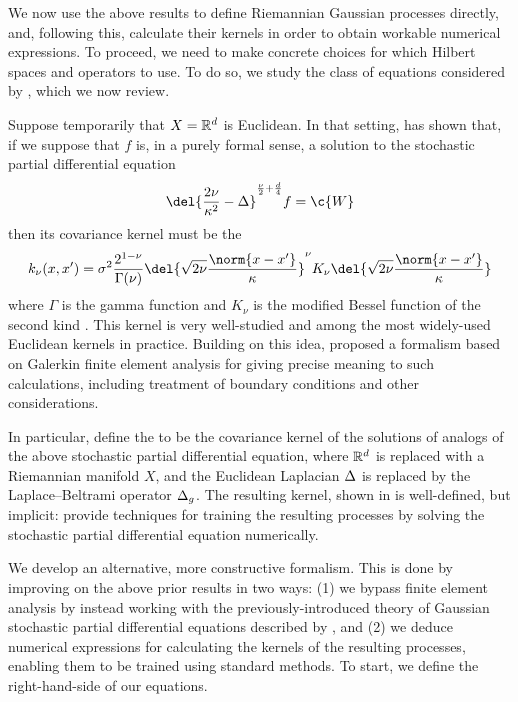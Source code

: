 \documentclass[11pt]{book}
\begin{document}
We now use the above results to define Riemannian Gaussian processes directly, and, following this, calculate their kernels in order to obtain workable numerical expressions.
To proceed, we need to make concrete choices for which Hilbert spaces and operators to use.
To do so, we study the class of equations considered by \textcite{whittle54,whittle63,lindgren11}, which we now review.

Suppose temporarily that $X = \mathbb{R}^d$ is Euclidean.
In that setting, \textcite{whittle54,whittle63} has shown that, if we suppose that $f$ is, in a purely formal sense, a solution to the stochastic partial differential equation
\[
\del{\frac{2\nu}{\kappa^2} - \lap}^{\frac{\nu}{2} + \frac{d}{4}} f = \c{W}
\]
then its covariance kernel must be the 
\[
k_{\nu}(x,x') = \sigma^2 \frac{2^{1-\nu}}{\Gamma(\nu)} \del{\sqrt{2\nu} \frac{\norm{x-x'}}{\kappa}}^\nu K_\nu \del{\sqrt{2\nu} \frac{\norm{x-x'}}{\kappa}}
\]
where $\Gamma$ is the gamma function and $K_\nu$ is the modified Bessel function of the second kind \cite{gradshteyn14}.
This kernel is very well-studied and among the most widely-used Euclidean kernels in practice.
Building on this idea, \textcite{lindgren11} proposed a formalism based on Galerkin finite element analysis for giving precise meaning to such calculations, including treatment of boundary conditions and other considerations.

In particular, \textcite{lindgren11} define the  to be the covariance kernel of the solutions of analogs of the above stochastic partial differential equation, where $\mathbb{R}^d$ is replaced with a Riemannian manifold $X$, and the Euclidean Laplacian $\Delta$ is replaced by the Laplace--Beltrami operator $\Delta_g$.
The resulting kernel, shown in  is well-defined, but implicit: \textcite{lindgren11} provide techniques for training the resulting processes by solving the stochastic partial differential equation numerically.

We develop an alternative, more constructive formalism.
This is done by improving on the above prior results in two ways: (1) we bypass finite element analysis by instead working with the previously-introduced theory of Gaussian stochastic partial differential equations described by \textcite{lototsky17}, and (2) we deduce numerical expressions for calculating the kernels of the resulting processes, enabling them to be trained using standard methods.
To start, we define the right-hand-side of our equations.
\end{document}
